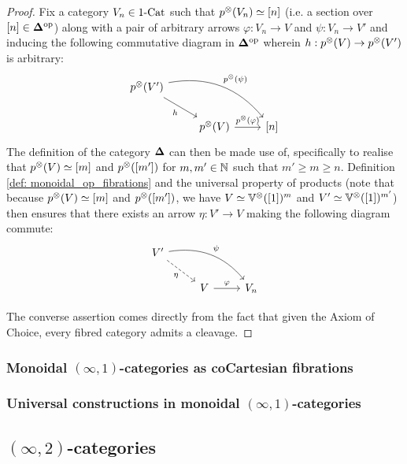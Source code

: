                 \begin{proof}
                    Fix a category $V_n \in 1\text{-}\mathrm{Cat}$ such that $p^{\tensor}(V_n) \cong [n]$ (i.e. a section over $[n] \in \mathbf{\Delta}^{\mathrm{op}}$) along with a pair of arbitrary arrows $\varphi: V_n \to V$ and $\psi: V_n \to V'$ and inducing the following commutative diagram in $\mathbf{\Delta}^{\mathrm{op}}$ wherein $h: p^{\tensor}(V) \to p^{\tensor}(V')$ is arbitrary:
                        $$
                            \begin{tikzcd}
                                p^{\tensor}(V') \arrow[rd, "h"'] \arrow[rrd, "p^{\tensor}(\psi)", bend left] &                                                  &       \\
                                                                                                             & p^{\tensor}(V) \arrow[r, "p^{\tensor}(\varphi)"] & {[n]}
                            \end{tikzcd}
                        $$
                    The definition of the category $\mathbf{\Delta}$ can then be made use of, specifically to realise that $p^{\tensor}(V) \cong [m]$ and $p^{\tensor}([m'])$ for $m, m' \in \mathbb{N}$ such that $m' \geq m \geq n$. Definition \ref{def: monoidal_op_fibrations} and the universal property of products (note that because $p^{\tensor}(V) \cong [m]$ and $p^{\tensor}([m'])$, we have $V \cong \V^{\tensor}([1])^m$ and $V' \cong \V^{\tensor}([1])^{m'}$) then ensures that there exists an arrow $\eta: V' \to V$ making the following diagram commute:
                        $$
                            \begin{tikzcd}
                                V' \arrow[rd, "\eta"', dashed] \arrow[rrd, "\psi", bend left] &                                                  &       \\
                                                                                                             & V \arrow[r, "\varphi"] & {V_n}
                            \end{tikzcd}
                        $$
                        
                    The converse assertion comes directly from the fact that given the Axiom of Choice, every fibred category admits a cleavage.
                \end{proof}
            
        \subsubsection{Monoidal \texorpdfstring{$(\infty, 1)$}{}-categories as coCartesian fibrations}
        
        \subsubsection{Universal constructions in monoidal \texorpdfstring{$(\infty, 1)$}{}-categories}
    
    \subsection{\texorpdfstring{$(\infty, 2)$}{}-categories}